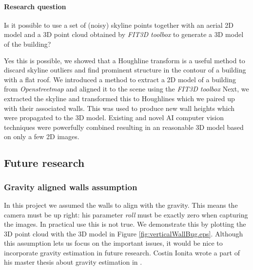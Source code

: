 \paragraph{Research question}
Is it possible to use a set of (noisy) skyline points together with an aerial
2D model and a 3D point cloud obtained by \emph{FIT3D toolbox\cite{FIT3D}} to generate a 3D model of the building?

Yes this is possible, we showed that a Houghline transform is a useful method to
discard skyline outliers and find prominent structure in the contour of a
building with a flat roof. We introduced a method to extract a 2D model of a
building from \emph{Openstreetmap\cite{Openstreetmap}} and aligned it to the
scene using the \emph{FIT3D toolbox\cite{FIT3D}} Next, we extracted the skyline
and transformed this to Houghlines which we paired up with their associated
walls. This was used to produce new wall heights which were propagated to the 3D
model.  Existing and novel AI computer vision techniques were powerfully
combined resulting in an reasonable 3D model based on only a few 2D images. 

\subsection{Future research}
\subsubsection{Gravity aligned walls assumption}
In this project we assumed the walls to align with the gravity.
This means the camera must be up right: his parameter \emph{roll} must be
exactly zero when capturing the images. 
In practical use this is not true. We demonstrate this by plotting the 3D point cloud
with the 3D model in Figure \ref{fig:verticalWallBug.eps}.
Although this assumption lets us focus on the important issues, it would be nice
to incorporate gravity estimation in future research.
Costin Ionita wrote a part of his master thesis about gravity estimation in
\cite{costin}.\\

